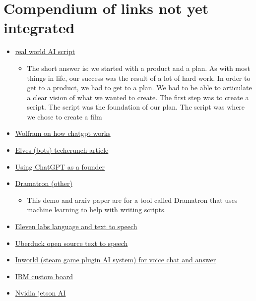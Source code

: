 \section{Compendium of links not yet integrated}
\begin{itemize}
\item
  \href{https://stephenfollows.com/how-we-got-hired-to-create-an-ai-generated-feature-film-screenplay/}{real
  world AI script}

  \begin{itemize}
  
  \item
    The short answer is: we started with a product and a plan. As with
    most things in life, our success was the result of a lot of hard
    work. In order to get to a product, we had to get to a plan. We had
    to be able to articulate a clear vision of what we wanted to create.
    The first step was to create a script. The script was the foundation
    of our plan. The script was where we chose to create a film
  \end{itemize}
\item
  \href{https://writings.stephenwolfram.com/2023/02/what-is-chatgpt-doing-and-why-does-it-work/}{Wolfram
  on how chatgpt works}

\item
  \href{https://techcrunch.com/2022/01/12/the-metaverse-will-be-filled-with-elves/}{Elves
  (bots) techcrunch article}
\item
  \href{https://www.atomic14.com/2022/12/05/using-chatgpt-as-a-co-founder.html}{Using
  ChatGPT as a founder}
\item
  \href{https://deepmind.github.io/dramatron/}{Dramatron (other)}

  \begin{itemize}
  
  \item
    This demo and arxiv paper are for a tool called Dramatron that uses
    machine learning to help with writing scripts.
  \end{itemize}
\item
  \href{https://beta.elevenlabs.io/}{Eleven labs language and text to
  speech}
\item
  \href{https://uberduck.ai/}{Uberduck open source text to speech}
\item
  \href{https://www.youtube.com/watch?v=DnF4WzM5LPU}{Inworld (steam game
  plugin AI system) for voice chat and answer}
\item
  \href{https://www.marktechpost.com/2022/10/27/ibm-research-introduces-artificial-intelligence-unit-aiu-its-first-complete-system-on-chip-designed-to-run-and-train-deep-learning-models-faster-and-more-efficiently-than-a-general-purpose-cpu/}{IBM
  custom board}
\item
  \href{https://www.okdo.com/p/nvidia-jetson-agx-orin-64gb-developer-kit/}{Nvidia
  jetson AI}


\end{itemize}
